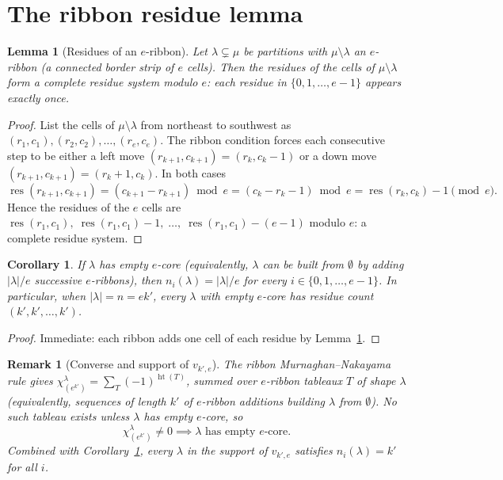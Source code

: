 \documentclass[11pt]{article}
\newtheorem{lemma}[theorem]{Lemma}
\newtheorem{corollary}[theorem]{Corollary}
\newtheorem{remark}[theorem]{Remark}
\theoremstyle{definition}
\DeclareMathOperator{\htg}{ht}
\DeclareMathOperator{\res}{res}
\begin{document}
\section{The ribbon residue lemma}

\begin{lemma}[Residues of an $e$-ribbon]\label{lem:ribbon}
Let $\lambda \subsetneq \mu$ be partitions with $\mu \setminus \lambda$ an $e$-ribbon
(a connected border strip of $e$ cells). Then the residues of the cells of
$\mu\setminus\lambda$ form a complete residue system modulo $e$: each residue in
$\{0,1,\ldots,e-1\}$ appears exactly once.
\end{lemma}

\begin{proof}
List the cells of $\mu\setminus\lambda$ from northeast to southwest as
$(r_1,c_1), (r_2,c_2), \ldots, (r_e,c_e)$. The ribbon condition forces each consecutive
step to be either a left move $(r_{k+1},c_{k+1}) = (r_k, c_k - 1)$ or a down move
$(r_{k+1},c_{k+1}) = (r_k+1, c_k)$. In both cases
\[
  \res(r_{k+1}, c_{k+1}) = (c_{k+1} - r_{k+1}) \bmod e
                          = (c_k - r_k - 1) \bmod e
                          = \res(r_k, c_k) - 1 \pmod e.
\]
Hence the residues of the $e$ cells are $\res(r_1,c_1),\; \res(r_1,c_1) - 1,\;\ldots,\;
\res(r_1,c_1) - (e-1)$ modulo $e$: a complete residue system.
\end{proof}

\begin{corollary}\label{cor:residue-uniform}
If $\lambda$ has empty $e$-core (equivalently, $\lambda$ can be built from $\emptyset$ by
adding $|\lambda|/e$ successive $e$-ribbons), then $n_i(\lambda) = |\lambda|/e$ for every
$i \in \{0,1,\ldots,e-1\}$. In particular, when $|\lambda| = n = ek'$, every $\lambda$
with empty $e$-core has residue count $(k',k',\ldots,k')$.
\end{corollary}

\begin{proof}
Immediate: each ribbon adds one cell of each residue by Lemma~\ref{lem:ribbon}.
\end{proof}

\begin{remark}[Converse and support of $v_{k',e}$]\label{rem:support}
The ribbon Murnaghan--Nakayama rule gives
$\chi^\lambda_{(e^{k'})} = \sum_T (-1)^{\htg(T)}$, summed over $e$-ribbon tableaux $T$ of
shape $\lambda$ (equivalently, sequences of length $k'$ of $e$-ribbon additions building
$\lambda$ from $\emptyset$). No such tableau exists unless $\lambda$ has empty $e$-core,
so
\[
  \chi^\lambda_{(e^{k'})} \ne 0 \implies \lambda \text{ has empty } e\text{-core}.
\]
Combined with Corollary~\ref{cor:residue-uniform}, every $\lambda$ in the support of
$v_{k',e}$ satisfies $n_i(\lambda) = k'$ for all $i$.
\end{remark}
\end{document}
